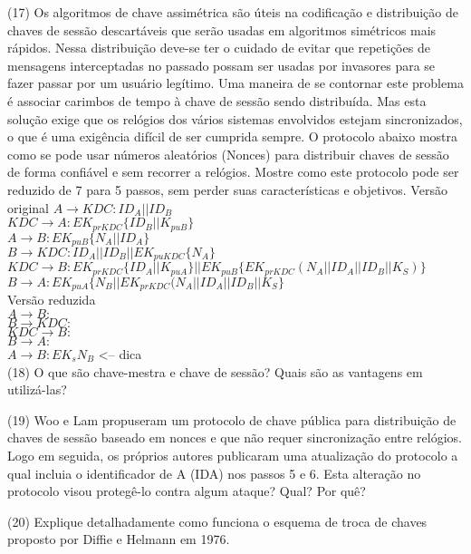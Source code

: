 \documentclass[10pt,a4paper]{report}
\begin{document}
(17) Os algoritmos de chave assimétrica são úteis na codificação e distribuição de chaves de sessão descartáveis que serão usadas em algoritmos simétricos mais rápidos. Nessa distribuição deve-se ter o cuidado de evitar que repetições de mensagens interceptadas no passado possam ser usadas por invasores para se fazer passar por um usuário legítimo. Uma maneira de se contornar este problema é associar carimbos de tempo à chave de sessão sendo distribuída. Mas esta solução exige que os relógios dos vários sistemas envolvidos estejam sincronizados, o que é uma exigência difícil de ser cumprida sempre. O protocolo abaixo mostra como se pode usar números aleatórios (Nonces) para distribuir chaves de sessão de forma confiável e sem recorrer a relógios. Mostre como este protocolo pode ser reduzido de 7 para 5 passos, sem perder suas características e objetivos.
Versão original
$A \rightarrow KDC : ID_A || ID_B$ \\
$KDC \rightarrow A : EK_{prKDC}\{ID_B || K_{puB}\}$\\
$A \rightarrow B : EK_{puB}\{N_A || ID_A\}$\\
$B \rightarrow KDC : ID_A || ID_B || EK_{puKDC}\{N_A\}$\\
$KDC \rightarrow B : EK_{prKDC}\{ID_A || K_{puA}\} || EK_{puB}\{EK_{prKDC}(N_A || ID_A || ID_B ||K_S)\}$\\
$B \rightarrow A : EK_{puA}\{N_B||EK_{prKDC}(N_A || ID_A || ID_B ||K_S\}$\\
Versão reduzida\\
$A \rightarrow B :$\\
$B \rightarrow KDC :$\\
$KDC \rightarrow B :$\\
$B \rightarrow A :$\\
$A \rightarrow B : EK_s{N_B}$ <-- dica\\

(18) O que são chave-mestra e chave de sessão? Quais são as vantagens em utilizá-las?

(19) Woo e Lam propuseram um protocolo de chave pública para distribuição de chaves de sessão baseado em nonces e que não requer sincronização entre relógios. Logo em seguida, os próprios autores publicaram uma atualização do protocolo a qual incluia o identificador de A (IDA) nos passos 5 e 6. Esta alteração no protocolo visou protegê-lo contra algum ataque? Qual? Por quê?

(20) Explique detalhadamente como funciona o esquema de troca de chaves proposto por Diffie e Helmann em 1976.
\end{document}

